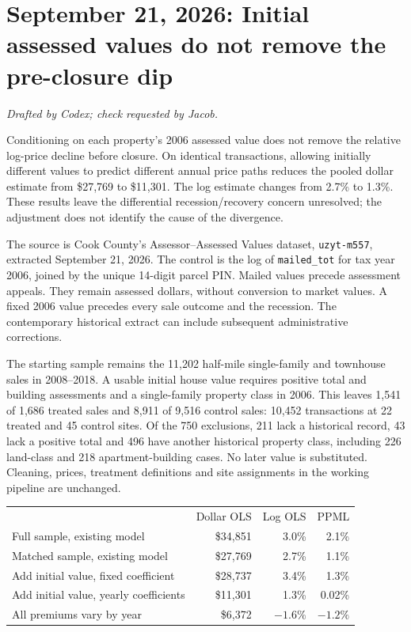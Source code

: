 \section*{September 21, 2026: Initial assessed values do not remove the pre-closure dip}
\textit{Drafted by Codex; check requested by Jacob.}

Conditioning on each property's 2006 assessed value does not remove the
relative log-price decline before closure. On identical transactions,
allowing initially different values to predict different annual price paths
reduces the pooled dollar estimate from \$27,769 to \$11,301. The log
estimate changes from 2.7\% to 1.3\%. These results leave the differential
recession/recovery concern unresolved; the adjustment does not identify
the cause of the divergence.

The source is Cook County's Assessor--Assessed Values dataset,
\texttt{uzyt-m557}, extracted September 21, 2026. The control is the log of
\texttt{mailed\_tot} for tax year 2006, joined by the unique 14-digit parcel
PIN. Mailed values precede assessment appeals. They remain assessed dollars,
without conversion to market values. A fixed 2006 value precedes every
sale outcome and the recession. The contemporary historical extract can
include subsequent administrative corrections.

The starting sample remains the 11,202 half-mile single-family and townhouse
sales in 2008--2018. A usable initial house value requires positive total and
building assessments and a single-family property class in 2006. This leaves
1,541 of 1,686 treated sales and 8,911 of 9,516 control sales: 10,452 transactions
at 22 treated and 45 control sites. Of the 750 exclusions, 211 lack a historical
record, 43 lack a positive total and 496 have another historical property class,
including 226 land-class and 218 apartment-building cases. No later value is
substituted. Cleaning, prices, treatment definitions and site assignments in
the working pipeline are unchanged.

\begin{center}
\begin{tabular}{lrrr}
 & Dollar OLS & Log OLS & PPML \\
Full sample, existing model & \$34,851 & 3.0\% & 2.1\% \\
Matched sample, existing model & \$27,769 & 2.7\% & 1.1\% \\
Add initial value, fixed coefficient & \$28,737 & 3.4\% & 1.3\% \\
Add initial value, yearly coefficients & \$11,301 & 1.3\% & 0.02\% \\
All premiums vary by year & \$6,372 & $-1.6\%$ & $-1.2\%$ \\
\end{tabular}
\end{center}

